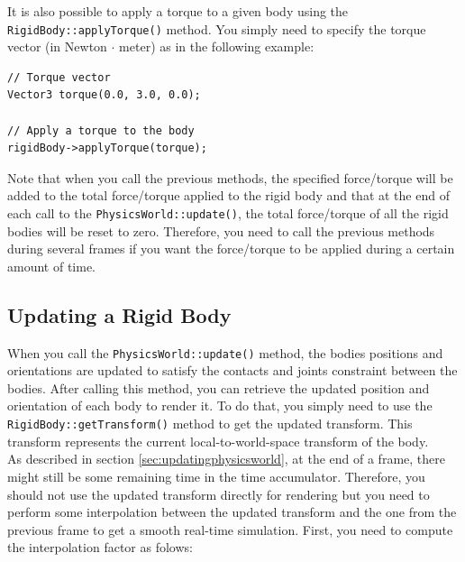 \documentclass[a4paper,12pt]{article}
\begin{document}
    \vspace{0.6cm}

     \begin{sloppypar}
        It is also possible to apply a torque to a given body using the \texttt{RigidBody::applyTorque()} method. You simply need to specify
	the torque vector (in Newton $\cdot$ meter) as in the following example: \\
     \end{sloppypar}

    \begin{lstlisting}
// Torque vector
Vector3 torque(0.0, 3.0, 0.0);

// Apply a torque to the body
rigidBody->applyTorque(torque);
  \end{lstlisting}

    \vspace{0.6cm}

    Note that when you call the previous methods, the specified force/torque will be added to the total force/torque applied to the rigid body and that
    at the end of each call to the \texttt{PhysicsWorld::update()}, the total force/torque of all the rigid bodies will be reset to zero.
    Therefore, you need to call the previous methods during several frames if you want the force/torque to be applied during a certain amount of time.

    \subsection{Updating a Rigid Body}

    When you call the \texttt{PhysicsWorld::update()} method, the bodies positions and orientations are updated to satisfy the contacts and joints
    constraint between the bodies. After calling this method, you can retrieve the updated position and orientation of each body to render it.
    To do that, you simply need to use the \texttt{RigidBody::getTransform()} method to get the updated transform. This transform represents the
    current local-to-world-space transform of the body. \\

    As described in section \ref{sec:updatingphysicsworld}, at the end of a frame, there might still be some remaining time in the time accumulator.
    Therefore, you should not use the updated transform directly for rendering but you need to perform some interpolation between the updated transform
    and the one from the previous frame to get a smooth real-time simulation.  First, you need to compute the interpolation factor as folows: \\
\end{document}
